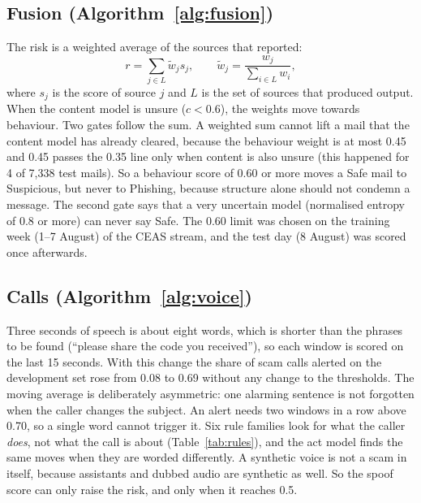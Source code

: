 {\subsection{Fusion (Algorithm~\ref{alg:fusion})}\label{sec:method-fusion}
The risk is a weighted average of the sources that reported:
\begin{equation}
r=\sum_{j\in L}\tilde w_j s_j,\qquad \tilde w_j=\frac{w_j}{\sum_{i\in L}w_i},
\end{equation}
where $s_j$ is the score of source $j$ and $L$ is the set of sources that produced output. When the content model is unsure ($c<0.6$), the weights move towards behaviour. Two gates follow the sum. A weighted sum cannot lift a mail that the content model has already cleared, because the behaviour weight is at most 0.45 and 0.45 passes the 0.35 line only when content is also unsure (this happened for 4 of 7{,}338 test mails). So a behaviour score of 0.60 or more moves a Safe mail to Suspicious, but never to Phishing, because structure alone should not condemn a message. The second gate says that a very uncertain model (normalised entropy of 0.8 or more) can never say Safe. The 0.60 limit was chosen on the training week (1--7 August) of the CEAS stream, and the test day (8 August) was scored once afterwards.

\subsection{Calls (Algorithm~\ref{alg:voice})}
Three seconds of speech is about eight words, which is shorter than the phrases to be found (``please share the code you received''), so each window is scored on the last 15 seconds. With this change the share of scam calls alerted on the development set rose from 0.08 to 0.69 without any change to the thresholds. The moving average is deliberately asymmetric: one alarming sentence is not forgotten when the caller changes the subject. An alert needs two windows in a row above 0.70, so a single word cannot trigger it. Six rule families look for what the caller \emph{does}, not what the call is about (Table~\ref{tab:rules}), and the act model finds the same moves when they are worded differently. A synthetic voice is not a scam in itself, because assistants and dubbed audio are synthetic as well. So the spoof score can only raise the risk, and only when it reaches 0.5.

}
